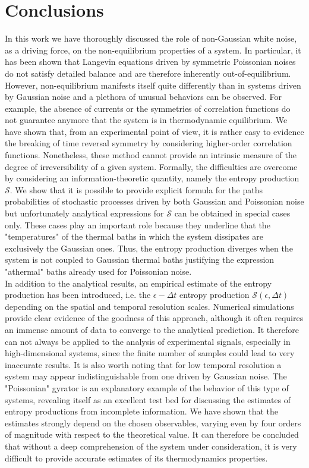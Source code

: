 \documentclass[12pt]{iopart}
\newcommand{\eps} {\epsilon}
\newcommand{\cS} {\mathcal{S}}
\begin{document}
\section{Conclusions}
In this work we have thoroughly discussed the role of non-Gaussian white noise, as a driving force, on the non-equilibrium properties of a system. In particular, it has been shown that Langevin equations driven by symmetric Poissonian noises do not satisfy detailed balance and are therefore inherently out-of-equilibrium. However, non-equilibrium manifests itself quite differently than in systems driven by Gaussian noise and a plethora of unusual behaviors can be observed. For example, the absence of currents or the symmetries of correlation functions do not guarantee anymore that the system is in thermodynamic equilibrium. We have shown that, from an experimental point of view, it is rather easy to evidence the breaking of time reversal symmetry by considering higher-order correlation functions. Nonetheless, these method cannot provide an intrinsic measure of the degree of irreversibility of a given system. Formally, the difficulties are overcome by considering an information-theoretic quantity, namely the entropy production $\cS$. We show that it is possible to provide explicit formula for the paths probabilities of stochastic processes driven by both Gaussian and Poissonian noise but unfortunately analytical expressions for $\cS$ can be obtained in special cases only. These cases play an important role because they underline that the "temperatures" of the thermal baths in which the system dissipates are exclusively the Gaussian ones. Thus, the entropy production diverges when the system is not coupled to Gaussian thermal baths justifying the expression "athermal" baths already used for Poissonian noise. \\
In addition to the analytical results, an empirical estimate of the entropy production has  been introduced, i.e. the $\epsilon-\Delta t$ entropy production $\cS(\eps,\Delta t)$ depending on the spatial and temporal resolution scales. Numerical simulations provide clear evidence of the goodness of this approach, although it often requires an immense amount of data to converge to the analytical prediction. It therefore can not always be applied to the analysis of experimental signals, especially in high-dimensional systems, since the finite number of samples could lead to very inaccurate results. It is also worth noting that for low temporal resolution a system may appear indistinguishable from one driven by Gaussian noise. The "Poissonian" gyrator is an explanatory example of the behavior of this type of systems, revealing itself as an excellent test bed for discussing the estimates of entropy productions from incomplete information. We have shown that the estimates strongly depend on the chosen observables, varying even by four orders of magnitude with respect to the theoretical value. It can therefore be concluded that without a deep comprehension of the system under consideration, it is very difficult to provide accurate estimates of its thermodynamics properties.
\end{document}
